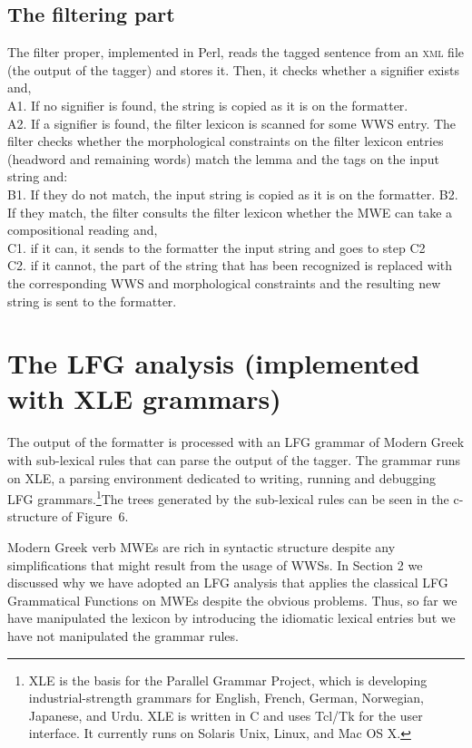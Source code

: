 \documentclass[output=paper,
modfonts
]{langscibook}
\begin{document}
\subsection{The filtering part}
The filter proper, implemented in Perl, reads the tagged sentence from an \textsc{xml} file (the output of the tagger) and stores it. Then, it checks whether a signifier exists and, \\
A1. If no signifier is found, the string is copied as it is on the formatter. \\
A2. If a signifier is found, the filter lexicon is scanned for some WWS entry. The filter checks whether the morphological constraints on the filter lexicon entries (headword and remaining words) match the lemma and the tags on the input string and:\\
B1. If they do not match, the input string is copied as it is on the formatter.
B2. If they match, the filter consults the filter lexicon whether the MWE can take a compositional reading and, \\
C1. if it can, it sends to the formatter the input string and goes to step C2\\
C2. if it cannot, the part of the string that has been recognized is replaced with the corresponding WWS and morphological constraints and the resulting new string is sent to the formatter.\\

\section{The LFG analysis (implemented with XLE grammars)}
The output of the formatter is processed with an LFG grammar of Modern Greek with sub-lexical rules that can parse the output of the tagger. The grammar runs on XLE, a parsing environment dedicated to writing, running and debugging LFG grammars.\footnote{XLE is the basis for the Parallel Grammar Project, which is developing industrial-strength grammars for English, French, German, Norwegian, Japanese, and Urdu. XLE is written in C and uses Tcl/Tk for the user interface. It currently runs on Solaris Unix, Linux, and Mac OS X.}The trees generated by the sub-lexical rules can be seen in the c-structure of Figure~6. 

Modern Greek verb MWEs are rich in syntactic structure despite any simplifications that might result from the usage of WWSs. In Section 2 we discussed why we have adopted an LFG analysis that applies the classical LFG Grammatical Functions on MWEs despite the obvious problems. Thus, so far we have manipulated the lexicon by introducing the idiomatic lexical entries but we have not manipulated the grammar rules.
\end{document}
